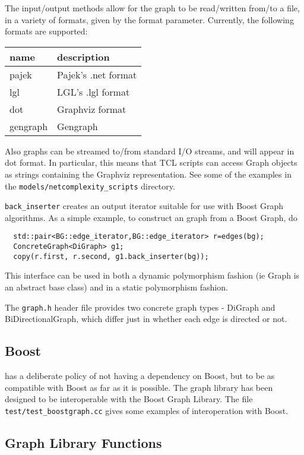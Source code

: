 The input/output methods allow for the graph to be read/written
from/to a file, in a variety of formats, given by the format
parameter. Currently, the following formats are supported:
\begin{tabular}{|l|l|}
\hline
name & description\\
\hline
pajek\index{pajek} & Pajek's .net format\\
lgl\index{lgl} & LGL's .lgl format\\
dot\index{dot} & Graphviz\index{Graphviz} format\\
gengraph & Gengraph\index{Gengraph}\\
\hline
\end{tabular}
Also graphs can be streamed to/from standard I/O streams, and will appear
in dot format. In particular, this means that TCL scripts can access
Graph objects as strings containing the Graphviz representation. See
some of the examples in the \verb+models/netcomplexity_scripts+ directory.

\verb+back_inserter+ creates an output iterator suitable for use with
Boost Graph algorithms. As a simple example, to construct an \EcoLab{}
graph from a Boost Graph, do
\begin{verbatim}
  std::pair<BG::edge_iterator,BG::edge_iterator> r=edges(bg);
  ConcreteGraph<DiGraph> g1;
  copy(r.first, r.second, g1.back_inserter(bg));
\end{verbatim}


This interface can be used in both a dynamic polymorphism fashion (ie
Graph is an abstract base class) and in a static polymorphism fashion.

The \verb+graph.h+ header file provides two concrete graph types -
DiGraph and BiDirectionalGraph, which differ just in whether each edge
is directed or not.

\subsection{Boost}

\EcoLab{} has a deliberate policy of not having a dependency on
Boost, but to be as compatible with Boost as far as it is
possible. The \EcoLab{} graph library has been designed to be
interoperable with the Boost Graph Library. The file
\verb+test/test_boostgraph.cc+ gives some examples of interoperation
with Boost.

\subsection{Graph Library Functions}

